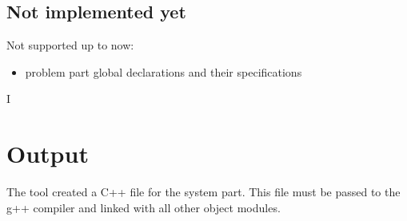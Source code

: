 \subsection{Not implemented yet}
Not supported up to now:
\begin{itemize}
\item problem part global declarations and their specifications
\end{itemize}I

\section{Output}
The tool created a C++ file for the system part. 
This file must be passed to the g++ compiler and linked with all 
other object modules.

